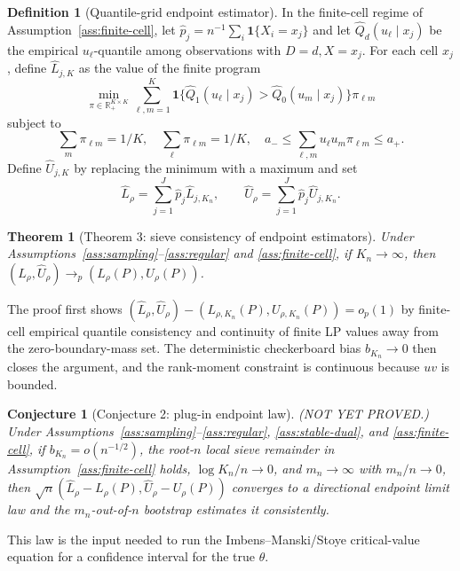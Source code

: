 \documentclass[11pt]{article}
\newcommand{\one}{\mathbf{1}}
\newcommand{\R}{\mathbb{R}}
\theoremstyle{definition}
\newtheorem{definition}{Definition}
\theoremstyle{plain}
\newtheorem{theorem}{Theorem}
\newtheorem{conjecture}{Conjecture}
\theoremstyle{remark}
\begin{document}
\begin{definition}[Quantile-grid endpoint estimator]\label{def:estimator}
In the finite-cell regime of Assumption~\ref{ass:finite-cell}, let \(\widehat p_j=n^{-1}\sum_i\one\{X_i=x_j\}\) and let \(\widehat Q_d(u_\ell\mid x_j)\) be the empirical \(u_\ell\)-quantile among observations with \(D=d,X=x_j\).  For each cell \(x_j\), define \(\widehat L_{j,K}\) as the value of the finite program
\[
\min_{\pi\in\R_+^{K\times K}}\sum_{\ell,m=1}^K
\one\{\widehat Q_1(u_\ell\mid x_j)>\widehat Q_0(u_m\mid x_j)\}\pi_{\ell m}
\]
subject to
\[
\sum_m\pi_{\ell m}=1/K,\quad \sum_\ell\pi_{\ell m}=1/K,\quad
a_-\le\sum_{\ell,m}u_\ell u_m\pi_{\ell m}\le a_+ .
\]
Define \(\widehat U_{j,K}\) by replacing the minimum with a maximum and set
\[
\widehat L_\rho=\sum_{j=1}^J\widehat p_j\widehat L_{j,K_n},\qquad
\widehat U_\rho=\sum_{j=1}^J\widehat p_j\widehat U_{j,K_n}.
\]
\end{definition}

\begin{theorem}[Theorem 3: sieve consistency of endpoint estimators]\label{thm:sieve-consistency}
Under Assumptions~\ref{ass:sampling}--\ref{ass:regular} and \ref{ass:finite-cell}, if \(K_n\to\infty\), then \((\widehat L_\rho,\widehat U_\rho)\to_p(L_\rho(P),U_\rho(P))\).
\end{theorem}
The proof first shows \((\widehat L_\rho,\widehat U_\rho)-(L_{\rho,K_n}(P),U_{\rho,K_n}(P))=o_p(1)\) by finite-cell empirical quantile consistency and continuity of finite LP values away from the zero-boundary-mass set.  The deterministic checkerboard bias \(b_{K_n}\to0\) then closes the argument, and the rank-moment constraint is continuous because \(uv\) is bounded.

\begin{conjecture}[Conjecture 2: plug-in endpoint law]\label{conj:inference}
(NOT YET PROVED.)  Under Assumptions~\ref{ass:sampling}--\ref{ass:regular}, \ref{ass:stable-dual}, and \ref{ass:finite-cell}, if \(b_{K_n}=o(n^{-1/2})\), the root-\(n\) local sieve remainder in Assumption~\ref{ass:finite-cell} holds, \(\log K_n/n\to0\), and \(m_n\to\infty\) with \(m_n/n\to0\), then \(\sqrt n(\widehat L_\rho-L_\rho(P),\widehat U_\rho-U_\rho(P))\) converges to a directional endpoint limit law and the \(m_n\)-out-of-\(n\) bootstrap estimates it consistently.
\end{conjecture}
This law is the input needed to run the Imbens--Manski/Stoye critical-value equation for a confidence interval for the true \(\theta\).
\end{document}
